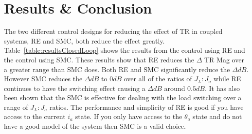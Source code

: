  \section{Results \& Conclusion}\label{sec:con}
% 
The two different control designs for reducing the effect of TR in coupled systems, RE and SMC, both
reduce the effect greatly. Table~\ref{table:resultsClosedLoop} shows the results from the control using RE 
and the control using SMC. These results show that RE reduces the $\Delta$ TR Mag over a
greater range than SMC does. Both RE and SMC significantly reduce the $\Delta dB$.  However SMC reduces the $\Delta dB$ to $0dB$ over all of the ratios of $J_L:J_a$ while RE
continues to have the switching effect causing a $\Delta dB$ around $0.5dB$. It has also been shown that the SMC is effective for dealing with the load switching over a range of $J_L:J_a$ ratios.  The performance and simplicity of RE is good if you have access to the current $i_a$ state. If you only have access to the $\theta_a$ state and do not have a good model of the system then SMC is a valid choice.
 
 
 